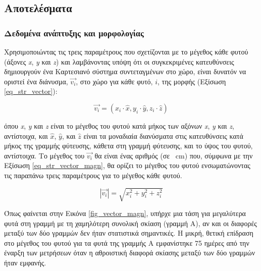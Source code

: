 \documentclass[12pt, a4paper]{report} %
\newcommand{\english}{\foreignlanguage{english}}
\begin{document}
\subsection{Αποτελέσματα}\label{sub_str_results}
\subsubsection{Δεδομένα ανάπτυξης και μορφολογίας}\label{subsub_str_results}

Χρησιμοποιώντας τις τρεις παραμέτρους που σχετίζονται με το μέγεθος κάθε φυτού (άξονες \english{\textit{x}, \textit{y}} 
και \english{\textit{z}}) και λαμβάνοντας υπόψη ότι οι συγκεκριμένες κατευθύνσεις δημιουργούν ένα Καρτεσιανό σύστημα 
συντεταγμένων στο χώρο, είναι δυνατόν να οριστεί ένα διάνυσμα, $\vec{v_i}$, στο χώρο για κάθε φυτό, $i$, της μορφής 
(Εξίσωση \ref{eq_str_vector}):

\begin{equation}
    \vec{v_i} = (x_i \cdot \hat{x}, y_i \cdot \hat{y}, z_i \cdot \hat{z})
    \label{eq_str_vector}
\end{equation}

\noindent όπου \english{\textit{x}, \textit{y}} και \english{\textit{z}} είναι το μέγεθος του φυτού κατά μήκος των αξόνων 
\english{\textit{x}, \textit{y}} και \english{\textit{z}}, αντίστοιχα, και $\hat{x}$, $\hat{y}$, και $\hat{z}$ είναι τα 
μοναδιαία διανύσματα στις κατευθύνσεις κατά μήκος της γραμμής φύτευσης, κάθετα στη γραμμή φύτευσης, και το ύψος του φυτού, 
αντίστοιχα. Το μέγεθος του $\vec{v_i}$ θα είναι ένας αριθμός (σε \SI{}{\centi\meter}) που, σύμφωνα με την Εξίσωση 
\ref{eq_str_vector_magn}, θα ορίζει το μέγεθος του φυτού ενσωματώνοντας τις παραπάνω τρεις παραμέτρους για το μέγεθος κάθε 
φυτού.

\begin{equation}
    |\vec{v_i}| = \sqrt{x_i^2 + y_i^2 + z_i^2}
    \label{eq_str_vector_magn}
\end{equation}

Όπως φαίνεται στην Εικόνα \ref{fig_vector_magn}, υπήρχε μια τάση για μεγαλύτερα φυτά στη γραμμή με τη χαμηλότερη συνολική 
σκίαση (γραμμή Α), αν και οι διαφορές μεταξύ των δύο γραμμών δεν ήταν στατιστικά σημαντικές. Η μικρή, θετική επίδραση 
στο μέγεθος του φυτού για τα φυτά της γραμμής Α εμφανίστηκε 75 ημέρες από την έναρξη των μετρήσεων όταν η αθροιστική 
διαφορά σκίασης μεταξύ των δύο γραμμών ήταν εμφανής.
\end{document}
